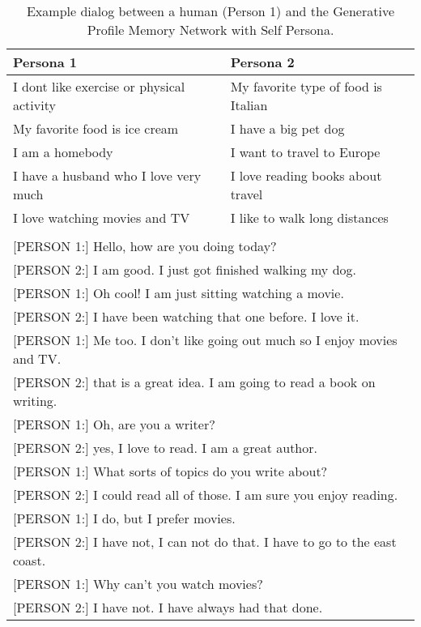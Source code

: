 \begin{table*}[t]
  \begin{center}
    \begin{small}
      \begin{tabular}{l|l}
        \toprule
        \textbf{Persona 1} & \textbf{Persona 2}\\
        \midrule
I dont like exercise or physical activity & My favorite type of food is Italian \\ 
My favorite food is ice cream & I have a big pet dog\\
I am a homebody &  I want to travel to Europe \\
 I have a husband who I love very much & I love reading books about travel \\
I love watching movies and TV& I like to walk long distances \\
\bottomrule
\multicolumn{2}{l}{ }\\
\multicolumn{2}{l}{[PERSON 1:] Hello, how are you doing today?}\\
\multicolumn{2}{l}{[PERSON 2:] I am good. I just got finished walking my dog.}\\
\multicolumn{2}{l}{[PERSON 1:] Oh cool! I am just sitting watching a movie. }\\
\multicolumn{2}{l}{[PERSON 2:] I have been watching that one before. I love it.}\\
\multicolumn{2}{l}{[PERSON 1:] Me too. I don't like going out much so I enjoy movies and TV.}\\
\multicolumn{2}{l}{[PERSON 2:] that is a great idea. I am going to read a book on writing.}\\
\multicolumn{2}{l}{[PERSON 1:] Oh, are you a writer?}\\
\multicolumn{2}{l}{[PERSON 2:] yes, I love to read. I am a great author.}\\
\multicolumn{2}{l}{[PERSON 1:] What sorts of topics do you write about?}\\
\multicolumn{2}{l}{[PERSON 2:] I could read all of those. I am sure you enjoy reading.}\\
\multicolumn{2}{l}{[PERSON 1:] I do, but I prefer movies.}\\
\multicolumn{2}{l}{[PERSON 2:] I have not, I can not do that. I have to go to the east coast.}\\
\multicolumn{2}{l}{[PERSON 1:] Why can't you watch movies?}\\
\multicolumn{2}{l}{[PERSON 2:] I have not. I have always had that done.}\\
      \end{tabular}
      \caption{Example dialog between a human (Person 1) and the Generative Profile Memory Network with Self Persona. %
 \label{table:gpm-example}}
    \end{small}
  \end{center}
\end{table*}


